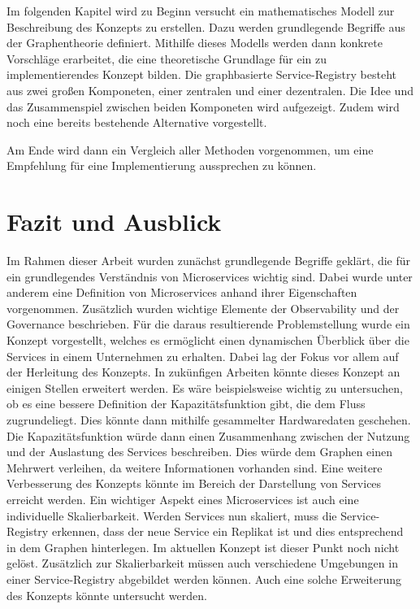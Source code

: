 \documentclass[
	12pt,
	BCOR=5mm,
	DIV=12,
	headinclude=on,
	footinclude=off,
	parskip=half,
	bibliography=totoc,
	listof=entryprefix,
	toc=listof,
	numbers=noenddot,
	plainfootsepline
]{scrreprt}
\begin{document}
Im folgenden Kapitel wird zu Beginn versucht ein mathematisches Modell zur Beschreibung des Konzepts zu erstellen. Dazu werden grundlegende Begriffe aus der Graphentheorie definiert. Mithilfe dieses Modells werden dann konkrete Vorschläge erarbeitet, die eine theoretische Grundlage für ein zu implementierendes Konzept bilden. Die graphbasierte Service-Registry besteht aus zwei großen Komponeten, einer zentralen und einer dezentralen. Die Idee und das Zusammenspiel zwischen beiden Komponeten wird aufgezeigt. Zudem wird noch eine bereits bestehende Alternative vorgestellt.

Am Ende wird dann ein Vergleich aller Methoden vorgenommen, um eine Empfehlung für eine Implementierung aussprechen zu können.

% 

% 

\chapter{Fazit und Ausblick}

Im Rahmen dieser Arbeit wurden zunächst grundlegende Begriffe geklärt, die für ein grundlegendes Verständnis von Microservices wichtig sind. Dabei wurde unter anderem eine Definition von Microservices anhand ihrer Eigenschaften vorgenommen. Zusätzlich wurden wichtige Elemente der Observability und der Governance beschrieben. Für die daraus resultierende Problemstellung wurde ein Konzept vorgestellt, welches es ermöglicht einen dynamischen Überblick über die Services in einem Unternehmen zu erhalten. Dabei lag der Fokus vor allem auf der Herleitung des Konzepts. In zukünfigen Arbeiten könnte dieses Konzept an einigen Stellen erweitert werden. Es wäre beispielsweise wichtig zu untersuchen, ob es eine bessere Definition der Kapazitätsfunktion gibt, die dem Fluss zugrundeliegt. Dies könnte dann mithilfe gesammelter Hardwaredaten geschehen. Die Kapazitätsfunktion würde dann einen Zusammenhang zwischen der Nutzung und der Auslastung des Services beschreiben. Dies würde dem Graphen einen Mehrwert verleihen, da weitere Informationen vorhanden sind. Eine weitere Verbesserung des Konzepts könnte im Bereich der Darstellung von Services erreicht werden. Ein wichtiger Aspekt eines Microservices ist auch eine individuelle Skalierbarkeit. Werden Services nun skaliert, muss die Service-Registry erkennen, dass der neue Service ein Replikat ist und dies entsprechend in dem Graphen hinterlegen. Im aktuellen Konzept ist dieser Punkt noch nicht gelöst. Zusätzlich zur Skalierbarkeit müssen auch verschiedene Umgebungen in einer Service-Registry abgebildet werden können. Auch eine solche Erweiterung des Konzepts könnte untersucht werden.
\end{document}
